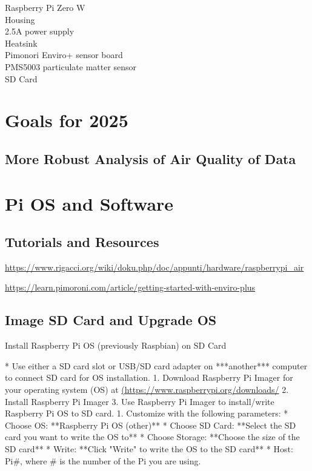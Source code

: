 \documentclass{article}
\begin{document}
\begin{description}
  \item[Raspberry Pi Zero W]
  \item[Housing]
  \item[2.5A power supply]
  \item[Heatsink]
  \item[Pimonori Enviro+ sensor board]
  \item[PMS5003 particulate matter sensor]
  \item[SD Card]
\end{description}

    
\section{Goals for 2025}

\subsection{More Robust Analysis of Air Quality of Data}


    

\section{Pi OS and Software}

\subsection{Tutorials and Resources}

\url{https://www.rigacci.org/wiki/doku.php/doc/appunti/hardware/raspberrypi_air}

\url{https://learn.pimoroni.com/article/getting-started-with-enviro-plus}



\subsection{Image SD Card and Upgrade OS}

Install Raspberry Pi OS (previously Raspbian) on SD Card


* Use either a SD card slot or USB/SD card adapter on ***another*** computer to connect SD card for OS installation.
    1. Download Raspberry Pi Imager for your operating system (OS) at \href{https://www.raspberrypi.org/downloads/}{(https://www.raspberrypi.org/downloads/}
    2. Install Raspberry Pi Imager
    3. Use Raspberry Pi Imager to install/write Raspberry Pi OS to SD card.
        1. Customize with the following parameters: 
            * Choose OS: **Raspberry Pi OS (other)**
            * Choose SD Card: **Select the SD card you want to write the OS to**
            * Choose Storage: **Choose the size of the SD card**
            * Write: **Click "Write" to write the OS to the SD card**
            * Host: Pi\#, where \# is the number of the Pi you are using.
\end{document}
